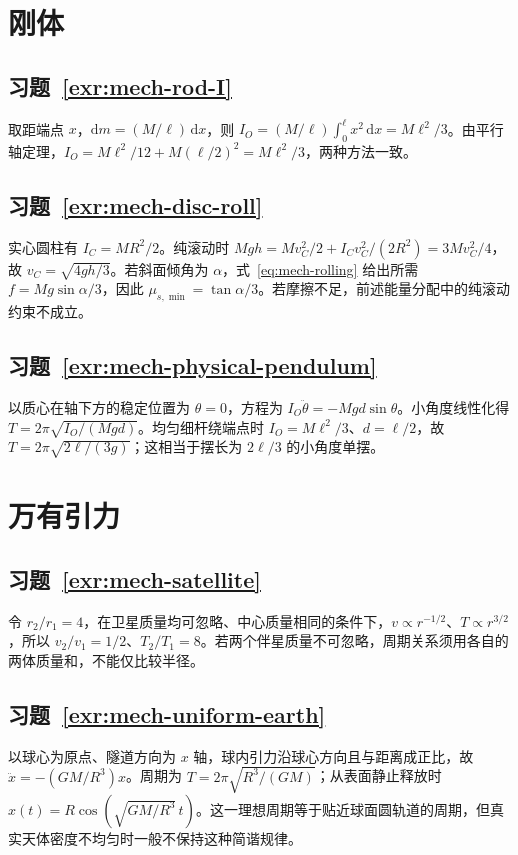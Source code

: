\documentclass[UTF8,12pt,a4paper,fontset=fandol]{ctexbook}
\begin{document}
\section{刚体}
\subsection*{习题~\ref{exr:mech-rod-I}}
取距端点 $x$，$\mathrm dm=(M/\ell)\,\mathrm dx$，则 $I_O=(M/\ell)\int_0^\ell x^2\,\mathrm dx=M\ell^2/3$。由平行轴定理，$I_O=M\ell^2/12+M(\ell/2)^2=M\ell^2/3$，两种方法一致。

\subsection*{习题~\ref{exr:mech-disc-roll}}
实心圆柱有 $I_C=MR^2/2$。纯滚动时 $Mgh=Mv_C^2/2+I_Cv_C^2/(2R^2)=3Mv_C^2/4$，故 $v_C=\sqrt{4gh/3}$。若斜面倾角为 $\alpha$，式~\eqref{eq:mech-rolling} 给出所需 $f=Mg\sin\alpha/3$，因此 $\mu_{s,\min}=\tan\alpha/3$。若摩擦不足，前述能量分配中的纯滚动约束不成立。

\subsection*{习题~\ref{exr:mech-physical-pendulum}}
以质心在轴下方的稳定位置为 $\theta=0$，方程为 $I_O\ddot\theta=-Mgd\sin\theta$。小角度线性化得 $T=2\pi\sqrt{I_O/(Mgd)}$。均匀细杆绕端点时 $I_O=M\ell^2/3$、$d=\ell/2$，故 $T=2\pi\sqrt{2\ell/(3g)}$；这相当于摆长为 $2\ell/3$ 的小角度单摆。

\section{万有引力}
\subsection*{习题~\ref{exr:mech-satellite}}
令 $r_2/r_1=4$，在卫星质量均可忽略、中心质量相同的条件下，$v\propto r^{-1/2}$、$T\propto r^{3/2}$，所以 $v_2/v_1=1/2$、$T_2/T_1=8$。若两个伴星质量不可忽略，周期关系须用各自的两体质量和，不能仅比较半径。

\subsection*{习题~\ref{exr:mech-uniform-earth}}
以球心为原点、隧道方向为 $x$ 轴，球内引力沿球心方向且与距离成正比，故 $\ddot x=-(GM/R^3)x$。周期为 $T=2\pi\sqrt{R^3/(GM)}$；从表面静止释放时 $x(t)=R\cos(\sqrt{GM/R^3}\,t)$。这一理想周期等于贴近球面圆轨道的周期，但真实天体密度不均匀时一般不保持这种简谐规律。
\end{document}
